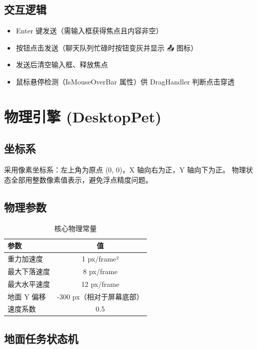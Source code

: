 \documentclass[12pt,a4paper]{ctexart}
\begin{document}
\subsection{交互逻辑}

\begin{itemize}
    \item Enter 键发送（需输入框获得焦点且内容非空）
    \item 按钮点击发送（聊天队列忙碌时按钮变灰并显示 📤 图标）
    \item 发送后清空输入框、释放焦点
    \item 鼠标悬停检测（IsMouseOverBar 属性）供 DragHandler 判断点击穿透
\end{itemize}

\section{物理引擎 (DesktopPet)}

\subsection{坐标系}

采用像素坐标系：左上角为原点 (0, 0)，X 轴向右为正，Y 轴向下为正。
物理状态全部用整数像素值表示，避免浮点精度问题。

\subsection{物理参数}

\begin{table}[H]
\centering
\caption{核心物理常量}
\label{tab:physics}
\begin{tabular}{lc}
\toprule
\textbf{参数} & \textbf{值} \\
\midrule
重力加速度 & 1 px/frame² \\
最大下落速度 & 8 px/frame \\
最大水平速度 & 12 px/frame \\
地面 Y 偏移 & -300 px（相对于屏幕底部） \\
速度系数 & 0.5 \\
\bottomrule
\end{tabular}
\end{table}

\subsection{地面任务状态机}
\end{document}
